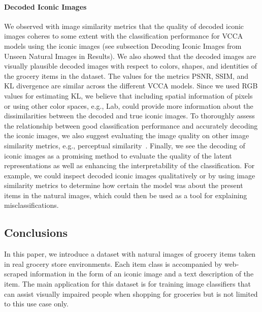 \paragraph{Decoded Iconic Images} %
We observed with image similarity metrics that the quality of decoded iconic images coheres to some extent with the classification performance for VCCA models using the iconic images (see subsection Decoding Iconic Images from Unseen Natural Images in Results). We also showed that the decoded images are visually plausible decoded images with respect to colors, shapes, and identities of the grocery items in the dataset. The values for the metrics PSNR, SSIM, and KL divergence are similar across the different VCCA models. Since we used RGB values for estimating KL, we believe that including spatial information of pixels or using other color spaces, e.g., Lab, could provide more information about the dissimilarities between the decoded and true iconic images. To thoroughly assess the relationship between good classification performance and accurately decoding the iconic images, we also suggest evaluating the image quality on other image similarity metrics, e.g., perceptual similarity~. Finally, we see the decoding of iconic images as a promising method to evaluate the quality of the latent representations as well as enhancing the interpretability of the classification. For example, we could inspect decoded iconic images qualitatively or by using image similarity metrics to determine how certain the model was about the present items in the natural images, which could then be used as a tool for explaining misclassifications.

\subsection{Conclusions}
\label{paperB:sec:conclusions}

In this paper, we introduce a dataset with natural images of grocery items taken in real grocery store environments. Each item class is accompanied by web-scraped information in the form of an iconic image and a text description of the item. The main application for this dataset is for training image classifiers that can assist visually impaired people when shopping for groceries but is not limited to this use case only. 


